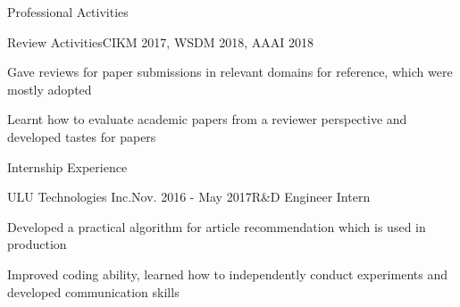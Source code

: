 \documentclass{resume} %
\begin{document}
\begin{rSection}{Professional Activities}
\begin{rSubsection}{Review Activities}{CIKM 2017, WSDM 2018, AAAI 2018}{}{}
\item Gave reviews for paper submissions in relevant domains for reference, which were mostly adopted
\item Learnt how to evaluate academic papers from a reviewer perspective and developed tastes for papers 
\end{rSubsection}
\end{rSection}


\begin{rSection}{Internship Experience}
\begin{rSubsection}{ULU Technologies Inc.}{Nov. 2016 - May 2017}{R$\&$D  Engineer Intern}{}
\item Developed a practical algorithm for article recommendation which is used in production 
\item Improved coding ability, learned how to independently conduct experiments and developed communication skills
\end{rSubsection}
\end{rSection}


\end{document}
